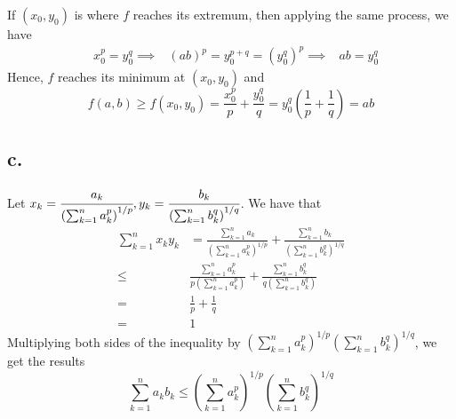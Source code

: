 \documentclass[11pt]{article}
\begin{document}
If $(x_0,y_0)$ is where $f$ reaches its extremum, then applying the same process, we have
\begin{equation*}
    \begin{aligned}
        &x_0^p = y_0^q
        \implies & (ab)^p = y_0^{p+q} = (y_0^q)^p
        \implies & ab = y_0^q
    \end{aligned}
\end{equation*}
Hence, $f$ reaches its minimum at $(x_0,y_0)$ and 
\[
    f(a,b) \ge f(x_0,y_0) =  \frac{x_0^p}{p} + \frac{y_0^q}{q} = y_0^q\left(\frac{1}{p} + \frac{1}{q}\right) = ab
\]
\subsection*{c.}
Let $x_k = \cfrac{a_k}{\left(\sum_{k=1}^n a_k^p \right)^{1/p}}, y_k = \cfrac{b_k}{\left(\sum_{k=1}^n b_k^q \right)^{1/q}}$.
We have that 
\begin{equation*}
    \begin{aligned}
        \sum_{k=1}^n x_ky_k &= \frac{\sum_{k=1}^n a_k}{\left(\sum_{k=1}^n a_k^p \right)^{1/p}} 
        + \frac{\sum_{k=1}^n b_k}{\left(\sum_{k=1}^n b_k^q \right)^{1/q}}  \\
        \le & \frac{\sum_{k=1}^n a_k^p}{p\left(\sum_{k=1}^n a_k^p \right)} 
        + \frac{\sum_{k=1}^n b_k^q}{q\left(\sum_{k=1}^n b_k^q \right)}  \\
        =& \frac{1}{p} + \frac{1}{q} \\
        =& 1
    \end{aligned}
\end{equation*}
Multiplying both sides of the inequality by $\left(\sum_{k=1}^n a_k^p \right)^{1/p}\left(\sum_{k=1}^n b_k^q \right)^{1/q}$, we get the results 
\[
    \sum_{k=1}^n a_kb_k \le \left(\sum_{k=1}^n a_k^p \right)^{1/p}\left(\sum_{k=1}^n b_k^q \right)^{1/q}    
\]
\end{document}
